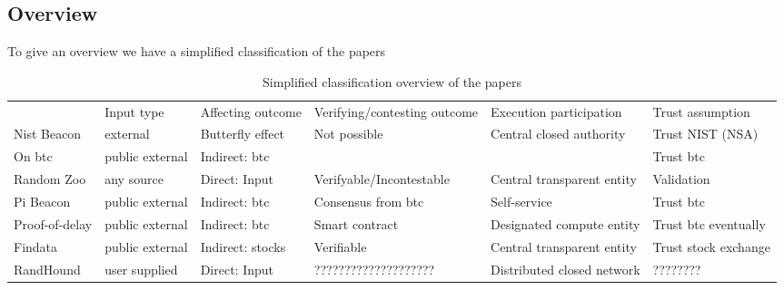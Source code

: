 \subsection*{Overview}
\label{sub:overview}
To give an overview we have a simplified classification of the papers

\begin{sidewaystable}[p]
    \centering
    \caption{Simplified classification overview of the papers}
    \label{tab:paper_overview}
    \begin{tabular}{@{}llllll@{}}
               & Input type       & Affecting outcome    & Verifying/contesting outcome & Execution participation    & Trust assumption     \\
Nist Beacon    & external         & Butterfly effect     & Not possible                 & Central closed authority   & Trust NIST (NSA)     \\
On btc         & public external  & Indirect: btc        &                              &                            & Trust btc            \\
Random Zoo     & any source       & Direct: Input        & Verifyable/Incontestable     & Central transparent entity & Validation           \\
Pi Beacon      & public external  & Indirect: btc        & Consensus from btc           & Self-service               & Trust btc            \\
Proof-of-delay & public external  & Indirect: btc        & Smart contract               & Designated compute entity  & Trust btc eventually \\
Findata        & public external  & Indirect: stocks     & Verifiable                   & Central transparent entity & Trust stock exchange \\
RandHound      & user supplied    & Direct: Input        & ????????????????????         & Distributed closed network & ????????
    \end{tabular}
\end{sidewaystable}

